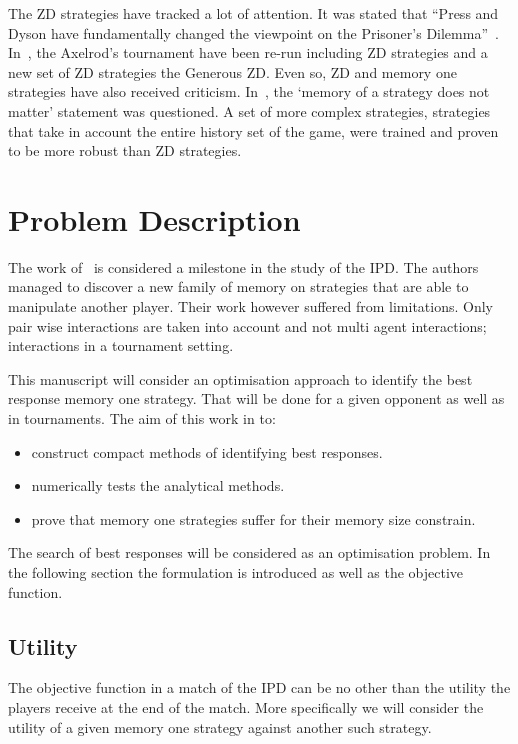 \documentclass[10pt]{article}
\begin{document}
The ZD strategies have tracked a lot of attention. It was stated that
``Press and Dyson have fundamentally changed the viewpoint on the Prisoner's
Dilemma''~\cite{Stewart2012}. In~\cite{Stewart2012}, the Axelrod's
tournament have been re-run including ZD strategies and a new set of ZD
strategies the Generous ZD. Even so, ZD and memory one strategies have
also received criticism. In~\cite{Harper2015}, the `memory of a strategy does
not matter' statement was questioned. A set of more complex strategies,
strategies that take in account the entire history set of the game, were
trained and proven to be more robust than ZD strategies.

\section{Problem Description}

The work of~\cite{Press2012} is considered a milestone in the study of the IPD.
The authors managed to discover a new family of memory on strategies that are
able to manipulate another player. Their work however suffered from limitations.
Only pair wise interactions are taken into account and not multi agent interactions;
interactions in a tournament setting.

This manuscript will consider an optimisation approach to identify the best
response memory one strategy. That will be done for a given opponent as well as
in tournaments. The aim of this work in to:

\begin{itemize}
    \item construct compact methods of identifying best responses.
    \item numerically tests the analytical methods.
    \item prove that memory one strategies suffer for their memory size constrain.
\end{itemize}

The search of best responses will be considered as an optimisation problem.
In the following section the formulation is introduced as well as the objective
function.

\subsection{Utility}

The objective function in a match of the IPD can be no other than the utility
the players receive at the end of the match. More specifically we will consider
the utility of a given memory one strategy against another such strategy.
\end{document}
